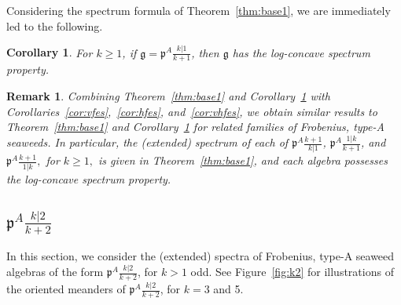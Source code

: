 \documentclass[letterpaper,10pt]{article}
\newtheorem{corollary}[theorem]{Corollary}
\newtheorem{remark}[theorem]{Remark}
\begin{document}
Considering the spectrum formula of Theorem~\ref{thm:base1}, we are immediately led to the following.

\begin{corollary}\label{cor:k1log}
For $k\ge 1$, if $\mathfrak{g}=\mathfrak{p}^A\frac{k|1}{k+1}$, then $\mathfrak{g}$ has the log-concave spectrum property.
\end{corollary}

\begin{remark}
    Combining Theorem~\ref{thm:base1} and Corollary~\ref{cor:k1log} with Corollaries~\ref{cor:vfes},~\ref{cor:hfes}, and~\ref{cor:vhfes}, we obtain similar results to Theorem~\ref{thm:base1} and Corollary~\ref{cor:k1log} for related families of Frobenius, type-A seaweeds. In particular, the \textup(extended\textup) spectrum of each of $\mathfrak{p}^A\frac{k+1}{k|1}$, $\mathfrak{p}^A\frac{1|k}{k+1}$, and $\mathfrak{p}^A\frac{k+1}{1|k},$ for $k\geq 1,$ is given in Theorem~\ref{thm:base1}, and each algebra possesses the log-concave spectrum property.
\end{remark}

\subsection{$\mathfrak{p}^A\frac{k|2}{k+2}$}

In this section, we consider the (extended) spectra of Frobenius, type-A seaweed algebras of the form $\mathfrak{p}^A\frac{k|2}{k+2}$, for $k>1$ odd. See Figure~\ref{fig:k2} for illustrations of the oriented meanders of $\mathfrak{p}^A\frac{k|2}{k+2}$, for $k=3$ and 5.
\end{document}
